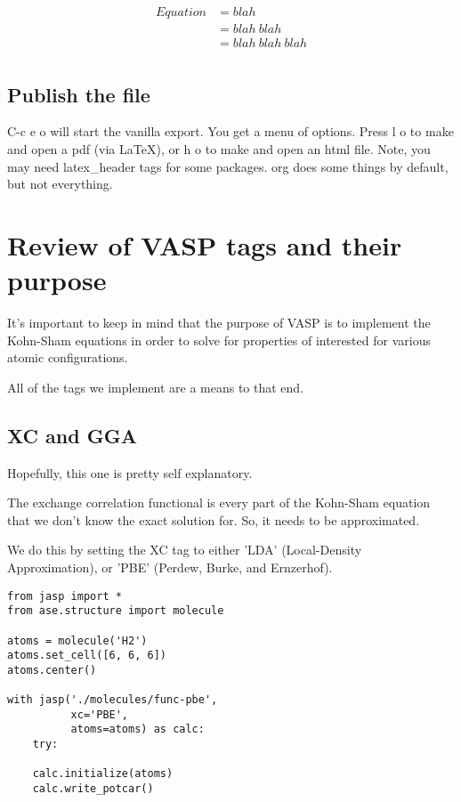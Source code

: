 \documentclass[11pt]{article}
\begin{document}
\begin{align}
Equation & = blah \\
& = blah \ blah \\
& = blah \ blah \ blah \\
\end{align}

\subsection{Publish the file}
\label{sec-1-3}
C-c e o  will start the vanilla export. You get a menu of options. Press l o to make and open a pdf (via \LaTeX{}), or h o to make and open an html file. Note, you may need latex\_header tags for some packages. org does some things by default, but not everything.



\section{Review of VASP tags and their purpose}
\label{sec-2}
It's important to keep in mind that the purpose of VASP is to implement the Kohn-Sham equations in order to solve for properties of interested for various atomic configurations.

All of the tags we implement are a means to that end.

\subsection{XC and GGA}
\label{sec-2-1}
Hopefully, this one is pretty self explanatory.

The exchange correlation functional is every part of the Kohn-Sham equation that we don't know the exact solution for. So, it needs to be approximated.

We do this by setting the XC tag to either 'LDA' (Local-Density Approximation), or 'PBE' (Perdew, Burke, and Ernzerhof).

\begin{verbatim}
from jasp import *
from ase.structure import molecule

atoms = molecule('H2')
atoms.set_cell([6, 6, 6])
atoms.center()

with jasp('./molecules/func-pbe',
          xc='PBE',
          atoms=atoms) as calc:
    try:

    calc.initialize(atoms)
    calc.write_potcar()
\end{verbatim}
\end{document}
